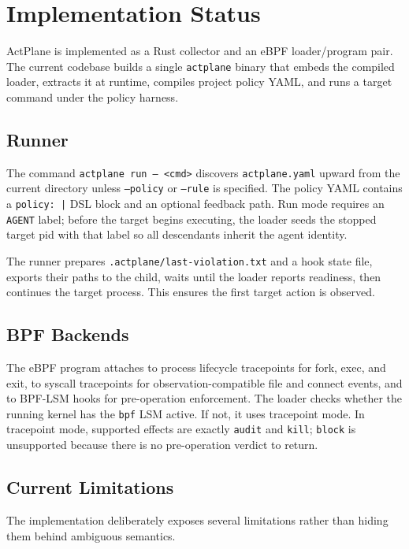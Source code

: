 \section{Implementation Status}

ActPlane is implemented as a Rust collector and an eBPF loader/program pair.
The current codebase builds a single \texttt{actplane} binary that embeds the
compiled loader, extracts it at runtime, compiles project policy YAML, and runs
a target command under the policy harness.

\subsection{Runner}

The command \texttt{actplane run -- <cmd>} discovers \texttt{actplane.yaml}
upward from the current directory unless \texttt{--policy} or \texttt{--rule} is
specified. The policy YAML contains a \texttt{policy: |} DSL block and an
optional feedback path. Run mode requires an \texttt{AGENT} label; before the
target begins executing, the loader seeds the stopped target pid with that label
so all descendants inherit the agent identity.

The runner prepares \texttt{.actplane/last-violation.txt} and a hook state file,
exports their paths to the child, waits until the loader reports readiness, then
continues the target process. This ensures the first target action is observed.

\subsection{BPF Backends}

The eBPF program attaches to process lifecycle tracepoints for fork, exec, and
exit, to syscall tracepoints for observation-compatible file and connect events,
and to BPF-LSM hooks for pre-operation enforcement. The loader checks whether
the running kernel has the \texttt{bpf} LSM active. If not, it uses tracepoint
mode. In tracepoint mode, supported effects are exactly \texttt{audit} and
\texttt{kill}; \texttt{block} is unsupported because there is no pre-operation
verdict to return.

\subsection{Current Limitations}

The implementation deliberately exposes several limitations rather than hiding
them behind ambiguous semantics.

